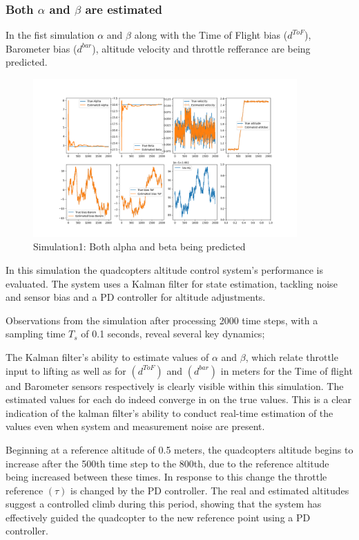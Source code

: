 \documentclass{report}
\begin{document}
\subsubsection*{Both \(\alpha\) and \(\beta\) are estimated}
In the fist simulation \(\alpha\) and \(\beta\) along with the Time of Flight
bias (\(d^{ToF}\)), Barometer bias (\(d^{bar}\)), altitude velocity and throttle
refferance are being predicted.
\begin{figure}[H]
  \centering
  \includegraphics[width=0.9\textwidth]{Pictures/no_constant_PD.png}
  \caption{Simulation1: Both alpha and beta being predicted}
  \label{fig:no_constant_PD}
\end{figure}
In this simulation the quadcopters altitude control system's performance is
evaluated. The system uses a Kalman filter for state estimation, tackling noise
and sensor bias and a PD controller for altitude adjustments.

Observations from the simulation after processing 2000 time steps, with a
sampling time \(T_s\) of 0.1 seconds, reveal several key dynamics;

The Kalman filter’s ability to estimate values of \(\alpha\) and \(\beta\),
which relate throttle input to lifting as well as for \((d^{ToF})\) and
\((d^{bar})\) in meters for the Time of flight and Barometer sensors
respectively is clearly visible within this simulation. The estimated values for
each do indeed converge in on the true values. This is a clear indication of the
kalman filter’s ability to conduct real-time estimation of the values even when
system and measurement noise are present.

Beginning at a reference altitude of 0.5 meters, the quadcopters altitude begins
to increase after the 500th time step to the 800th, due to the reference
altitude being increased between these times. In response to this change the
throttle reference \((\tau)\) is changed by the PD controller. The real and
estimated altitudes suggest a controlled climb during this period, showing that
the system has effectively guided the quadcopter to the new reference point
using a PD controller.
\end{document}
